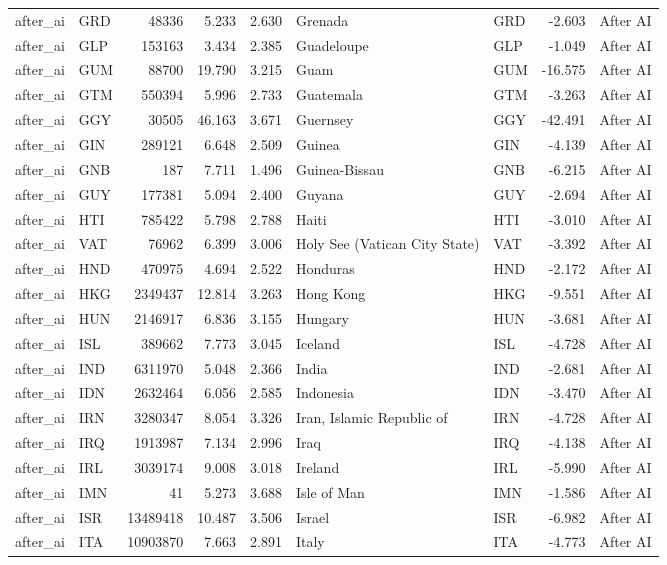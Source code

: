 \begin{tabular}{llrrrllrl}
after\_ai & GRD & 48336 & 5.233 & 2.630 & Grenada & GRD & -2.603 & After AI \\
after\_ai & GLP & 153163 & 3.434 & 2.385 & Guadeloupe & GLP & -1.049 & After AI \\
after\_ai & GUM & 88700 & 19.790 & 3.215 & Guam & GUM & -16.575 & After AI \\
after\_ai & GTM & 550394 & 5.996 & 2.733 & Guatemala & GTM & -3.263 & After AI \\
after\_ai & GGY & 30505 & 46.163 & 3.671 & Guernsey & GGY & -42.491 & After AI \\
after\_ai & GIN & 289121 & 6.648 & 2.509 & Guinea & GIN & -4.139 & After AI \\
after\_ai & GNB & 187 & 7.711 & 1.496 & Guinea-Bissau & GNB & -6.215 & After AI \\
after\_ai & GUY & 177381 & 5.094 & 2.400 & Guyana & GUY & -2.694 & After AI \\
after\_ai & HTI & 785422 & 5.798 & 2.788 & Haiti & HTI & -3.010 & After AI \\
after\_ai & VAT & 76962 & 6.399 & 3.006 & Holy See (Vatican City State) & VAT & -3.392 & After AI \\
after\_ai & HND & 470975 & 4.694 & 2.522 & Honduras & HND & -2.172 & After AI \\
after\_ai & HKG & 2349437 & 12.814 & 3.263 & Hong Kong & HKG & -9.551 & After AI \\
after\_ai & HUN & 2146917 & 6.836 & 3.155 & Hungary & HUN & -3.681 & After AI \\
after\_ai & ISL & 389662 & 7.773 & 3.045 & Iceland & ISL & -4.728 & After AI \\
after\_ai & IND & 6311970 & 5.048 & 2.366 & India & IND & -2.681 & After AI \\
after\_ai & IDN & 2632464 & 6.056 & 2.585 & Indonesia & IDN & -3.470 & After AI \\
after\_ai & IRN & 3280347 & 8.054 & 3.326 & Iran, Islamic Republic of & IRN & -4.728 & After AI \\
after\_ai & IRQ & 1913987 & 7.134 & 2.996 & Iraq & IRQ & -4.138 & After AI \\
after\_ai & IRL & 3039174 & 9.008 & 3.018 & Ireland & IRL & -5.990 & After AI \\
after\_ai & IMN & 41 & 5.273 & 3.688 & Isle of Man & IMN & -1.586 & After AI \\
after\_ai & ISR & 13489418 & 10.487 & 3.506 & Israel & ISR & -6.982 & After AI \\
after\_ai & ITA & 10903870 & 7.663 & 2.891 & Italy & ITA & -4.773 & After AI \\

\end{tabular}
